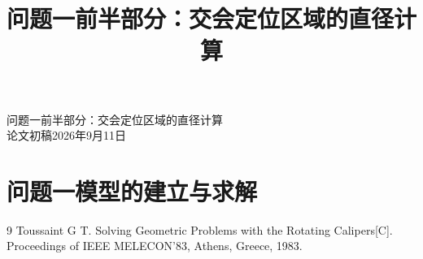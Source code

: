 \documentclass[withoutpreface,bwprint]{cumcmthesis}
\title{问题一前半部分：交会定位区域的直径计算}
\begin{document}
\linespread{1.2}\selectfont
\begin{center}
{\heiti{} 问题一前半部分：交会定位区域的直径计算}\\[0.5em]
{\small 论文初稿\quad 2026年9月11日}
\end{center}
\setcounter{section}{4}
\section{问题一模型的建立与求解}

\begin{thebibliography}{9}
 Toussaint G T. Solving Geometric Problems with the Rotating Calipers[C]. Proceedings of IEEE MELECON'83, Athens, Greece, 1983.
\end{thebibliography}
\end{document}
